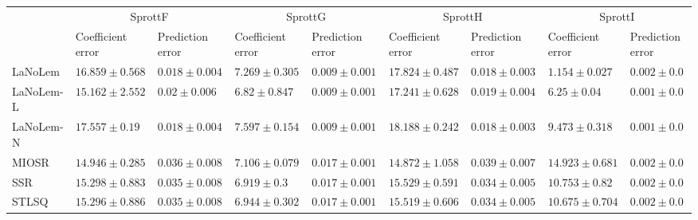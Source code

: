 \begin{table*}
{\begin{tabular}{lllllllll}
 & \multicolumn{2}{c}{SprottF} & \multicolumn{2}{c}{SprottG} & \multicolumn{2}{c}{SprottH} & \multicolumn{2}{c}{SprottI} \\
 & Coefficient error & Prediction error & Coefficient error & Prediction error & Coefficient error & Prediction error & Coefficient error & Prediction error \\
\midrule
LaNoLem & $16.859\pm 0.568$ & $0.018\pm 0.004$ & $7.269\pm 0.305$ & $0.009\pm 0.001$ & $17.824\pm 0.487$ & $0.018\pm 0.003$ & $\mathbf{1.154}\pm 0.027$ & $0.002\pm 0.0$ \\
LaNoLem-L & $15.162\pm 2.552$ & $0.02\pm 0.006$ & $\mathbf{6.82}\pm 0.847$ & $0.009\pm 0.001$ & $17.241\pm 0.628$ & $0.019\pm 0.004$ & $6.25\pm 0.04$ & $0.001\pm 0.0$ \\
LaNoLem-N & $17.557\pm 0.19$ & $\mathbf{0.018}\pm 0.004$ & $7.597\pm 0.154$ & $\mathbf{0.009}\pm 0.001$ & $18.188\pm 0.242$ & $\mathbf{0.018}\pm 0.003$ & $9.473\pm 0.318$ & $\mathbf{0.001}\pm 0.0$ \\
MIOSR & $\mathbf{14.946}\pm 0.285$ & $0.036\pm 0.008$ & $7.106\pm 0.079$ & $0.017\pm 0.001$ & $\mathbf{14.872}\pm 1.058$ & $0.039\pm 0.007$ & $14.923\pm 0.681$ & $0.002\pm 0.0$ \\
SSR & $15.298\pm 0.883$ & $0.035\pm 0.008$ & $6.919\pm 0.3$ & $0.017\pm 0.001$ & $15.529\pm 0.591$ & $0.034\pm 0.005$ & $10.753\pm 0.82$ & $0.002\pm 0.0$ \\
STLSQ & $15.296\pm 0.886$ & $0.035\pm 0.008$ & $6.944\pm 0.302$ & $0.017\pm 0.001$ & $15.519\pm 0.606$ & $0.034\pm 0.005$ & $10.675\pm 0.704$ & $0.002\pm 0.0$ \\

\midrule


\end{tabular}}
\end{table*}
